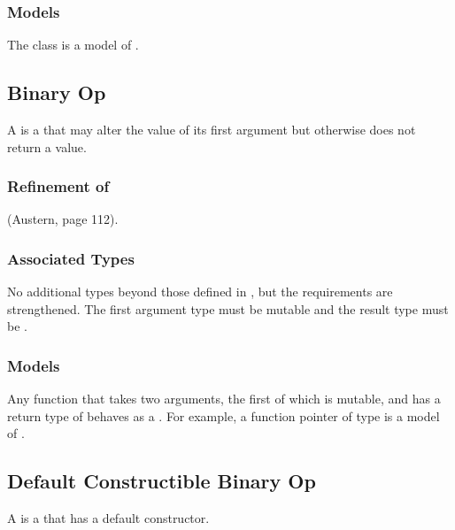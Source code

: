 \documentclass[11pt]{rnote}
\begin{document}
\begin{complist}
\end{complist}

\subsubsection{Models}

The  class is a model of .

\subsection{Binary Op}

A  is a  that may alter
the value of its first argument but otherwise does not return a
value.

\subsubsection{Refinement of}
 (Austern, page 112).

\subsubsection{Associated Types}

No additional types beyond those defined in , 
but the requirements are strengthened. The first argument type must be 
mutable and the result type must be .

\subsubsection{Models}

Any function that takes two arguments, the first of which is mutable,
and has a return type of  behaves as a . For example, a function pointer of type  is a model of .

\subsection{Default Constructible Binary Op}

A  is a 
that has a default constructor.
\end{document}
